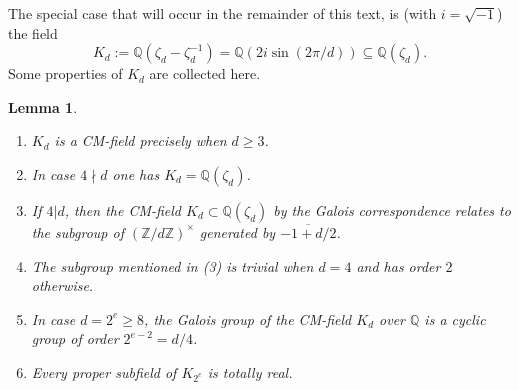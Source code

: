 \documentclass[a4paper,12pt]{amsart}
\newcommand{\ZZ}{{\mathbb Z}}
\newcommand{\QQ}{{\mathbb Q}}
\numberwithin{equation}{section}
\theoremstyle{plain}
\numberwithin{thm}{section}
\newtheorem{lem}[thm]{Lemma}
\begin{document}
The special case that will occur in the remainder of this text,
is (with $i=\sqrt{-1}$) the field
\[K_d:=\QQ(\zeta_d-\zeta_d^{-1})=\QQ(2i\sin(2\pi/d))\subseteq\QQ(\zeta_d).\]
Some properties of $K_d$ are collected here.
\begin{lem}\label{fields}
    \begin{enumerate}
        \item $K_d$ is a CM-field precisely when $d\geq 3$.
        \item In case $4\nmid d$ one has $K_d=\QQ(\zeta_d)$.
        \item If $4|d$, then the CM-field $K_d\subset\QQ(\zeta_d)$ by the
        Galois correspondence relates to the subgroup
        of $(\ZZ/d\ZZ)^\times$ generated by
        $\overline{-1+d/2}$.
        \item The subgroup mentioned in (3) is trivial when
        $d=4$ and has order $2$ otherwise.
        \item In case $d=2^e\geq 8$, the Galois group of
        the CM-field $K_d$ over $\QQ$ is a cyclic group of order $2^{e-2}=d/4$.
        \item Every proper subfield of $K_{2^e}$ is totally real.
    \end{enumerate}
\end{lem}
\end{document}
